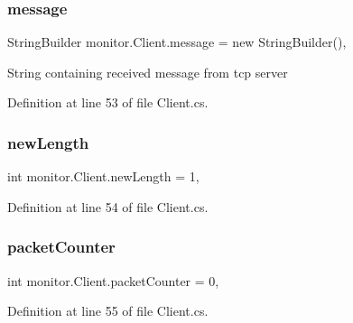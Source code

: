 \mbox{\label{classmonitor_1_1_client_a2ddb7073c4bf8a42c231939d5c21d68e}} 
\subsubsection{message}
{\footnotesize\ttfamily String\+Builder monitor.\+Client.\+message = new String\+Builder()\hspace{0.3cm}{\ttfamily [static]}, {\ttfamily [private]}}



String containing received message from tcp server 



Definition at line 53 of file Client.\+cs.

\mbox{\label{classmonitor_1_1_client_a7083940b8fea9df2b080e3844549e805}} 
\subsubsection{new\+Length}
{\footnotesize\ttfamily int monitor.\+Client.\+new\+Length = 1\hspace{0.3cm}{\ttfamily [static]}, {\ttfamily [private]}}



Definition at line 54 of file Client.\+cs.

\mbox{\label{classmonitor_1_1_client_a7eb13840c83beb2ab191cae3ba3210c9}} 
\subsubsection{packet\+Counter}
{\footnotesize\ttfamily int monitor.\+Client.\+packet\+Counter = 0\hspace{0.3cm}{\ttfamily [static]}, {\ttfamily [private]}}



Definition at line 55 of file Client.\+cs.

\mbox{\label{classmonitor_1_1_client_a01cb2a551d81fd82d2f7015e177f0f18}} 
